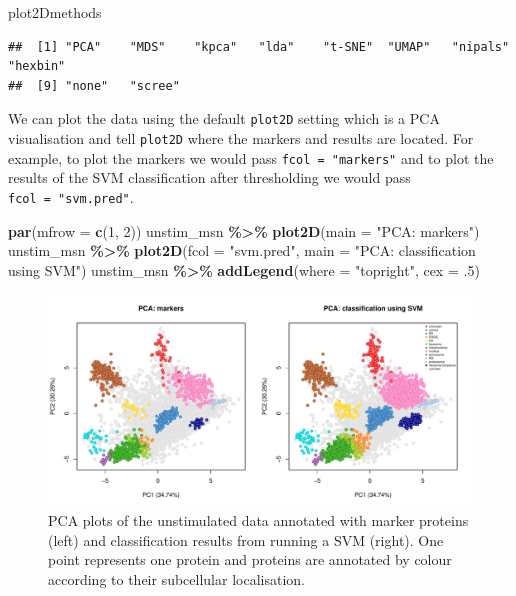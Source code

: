 \documentclass[9pt,a4paper,]{extarticle}
\newenvironment{Shaded}{\begin{snugshade}}{\end{snugshade}}
\newcommand{\AttributeTok}[1]{\textcolor[rgb]{0.13,0.29,0.53}{#1}}
\newcommand{\DecValTok}[1]{\textcolor[rgb]{0.00,0.00,0.81}{#1}}
\newcommand{\FunctionTok}[1]{\textcolor[rgb]{0.13,0.29,0.53}{\textbf{#1}}}
\newcommand{\NormalTok}[1]{#1}
\newcommand{\SpecialCharTok}[1]{\textcolor[rgb]{0.81,0.36,0.00}{\textbf{#1}}}
\newcommand{\StringTok}[1]{\textcolor[rgb]{0.31,0.60,0.02}{#1}}
\begin{document}
\begin{Shaded}
\begin{Highlighting}[]
\NormalTok{plot2Dmethods}
\end{Highlighting}
\end{Shaded}

\begin{verbatim}
##  [1] "PCA"    "MDS"    "kpca"   "lda"    "t-SNE"  "UMAP"   "nipals" "hexbin"
##  [9] "none"   "scree"
\end{verbatim}

We can plot the data using the default \texttt{plot2D} setting which is a PCA
visualisation and tell \texttt{plot2D} where the markers and results are located. For
example, to plot the markers we would pass \texttt{fcol\ =\ "markers"} and to plot the
results of the SVM classification after thresholding we would pass
\texttt{fcol\ =\ "svm.pred"}.

\begin{Shaded}
\begin{Highlighting}[]
\FunctionTok{par}\NormalTok{(}\AttributeTok{mfrow =} \FunctionTok{c}\NormalTok{(}\DecValTok{1}\NormalTok{, }\DecValTok{2}\NormalTok{))}
\NormalTok{unstim\_msn }\SpecialCharTok{\%\textgreater{}\%} 
  \FunctionTok{plot2D}\NormalTok{(}\AttributeTok{main =} \StringTok{"PCA: markers"}\NormalTok{)}
\NormalTok{unstim\_msn }\SpecialCharTok{\%\textgreater{}\%} 
  \FunctionTok{plot2D}\NormalTok{(}\AttributeTok{fcol =} \StringTok{"svm.pred"}\NormalTok{, }\AttributeTok{main =} \StringTok{"PCA: classification using SVM"}\NormalTok{)}
\NormalTok{unstim\_msn }\SpecialCharTok{\%\textgreater{}\%} 
  \FunctionTok{addLegend}\NormalTok{(}\AttributeTok{where =} \StringTok{"topright"}\NormalTok{, }\AttributeTok{cex =}\NormalTok{ .}\DecValTok{5}\NormalTok{)}
\end{Highlighting}
\end{Shaded}

\begin{figure}[H]

{\centering \includegraphics[width=0.9\linewidth,]{figs/svm_pca} 

}

\caption{PCA plots of the unstimulated data annotated with marker proteins (left) and classification results from running a SVM (right). One point represents one protein and proteins are annotated by colour according to their subcellular localisation.}\label{fig:svm-pca-res}
\end{figure}
\end{document}
